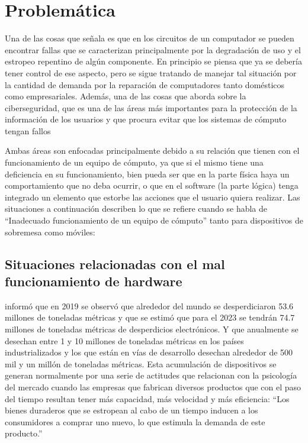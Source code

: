\pagebreak
\section{Problemática}

Una de las cosas que señala \textcite{Jin2023} es que en los circuitos de un
computador se pueden encontrar fallas que se caracterizan principalmente por la
degradación de uso y el estropeo repentino de algún componente. En principio
se piensa que ya se debería tener control de ese aspecto, pero se sigue tratando
de manejar tal situación por la cantidad de demanda por la reparación de
computadores tanto domésticos como empresariales. Además, una de las cosas que
\textcite{Aboaoja2022} aborda sobre la ciberseguridad, que es una de las áreas
más importantes para la protección de la información de los usuarios y que
procura evitar que los sistemas de cómputo tengan fallos

Ambas áreas son enfocadas principalmente debido a su relación que tienen con el
funcionamiento de un equipo de cómputo, ya que si el mismo tiene una deficiencia
en su funcionamiento, bien pueda ser que en la parte física haya un
comportamiento que no deba ocurrir, o que en el software (la parte lógica) tenga 
integrado un elemento que estorbe las acciones que el usuario quiera realizar.
Las situaciones a continuación describen lo que se refiere cuando se habla de
``Inadecuado funcionamiento de un equipo de cómputo'' tanto para dispositivos de
sobremesa como móviles:

\subsection{Situaciones relacionadas con el mal funcionamiento de hardware}

\textcite{Herat2020} informó que en 2019 se observó que alrededor del mundo se
desperdiciaron 53.6 millones de toneladas métricas y que se estimó que para el
2023 se tendrán 74.7 millones de toneladas métricas de desperdicios
electrónicos. Y que anualmente se desechan entre 1 y 10 millones de toneladas
métricas en los países industrializados y los que están en vías de desarrollo
desechan alrededor de 500 mil y un millón de toneladas métricas. Esta
acumulación de dispositivos se generan normalmente por una serie de actitudes
que \textcite{Hartl2023} relacionan con la psicología del mercado cuando las
empresas que fabrican diversos productos que con el paso del tiempo resultan
tener más capacidad, más velocidad y más eficiencia: ``Los bienes duraderos
que se estropean al cabo de un tiempo inducen a los consumidores a comprar uno
nuevo, lo que estimula la demanda de este producto.''

